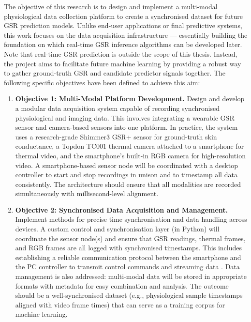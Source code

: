 The objective of this research is to design and implement a multi-modal physiological data collection platform to create a synchronised dataset for future GSR prediction models. Unlike end-user applications or final predictive systems, this work focuses on the data acquisition infrastructure --- essentially building the foundation on which real-time GSR inference algorithms can be developed later. Note that real-time GSR prediction is outside the scope of this thesis. Instead, the project aims to facilitate future machine learning by providing a robust way to gather ground-truth GSR and candidate predictor signals together. The following specific objectives have been defined to achieve this aim:

\begin{enumerate}
  \item \textbf{Objective 1: Multi-Modal Platform Development.} Design and develop a modular data acquisition system capable of recording synchronised physiological and imaging data. This involves integrating a wearable GSR sensor and camera-based sensors into one platform. In practice, the system uses a research-grade Shimmer3 GSR+ sensor \citep{ref8} for ground-truth skin conductance, a Topdon TC001 thermal camera \citep{ref20} attached to a smartphone for thermal video, and the smartphone's built-in RGB camera for high-resolution video. A smartphone-based sensor node will be coordinated with a desktop controller to start and stop recordings in unison and to timestamp all data consistently. The architecture should ensure that all modalities are recorded simultaneously with millisecond-level alignment.
  \item \textbf{Objective 2: Synchronised Data Acquisition and Management.} Implement methods for precise time synchronisation and data handling across devices. A custom control and synchronisation layer (in Python) will coordinate the sensor node(s) and ensure that GSR readings, thermal frames, and RGB frames are all logged with synchronised timestamps. This includes establishing a reliable communication protocol between the smartphone and the PC controller to transmit control commands and streaming data \citep{ref9}. Data management is also addressed: multi-modal data will be stored in appropriate formats with metadata for easy combination and analysis. The outcome should be a well-synchronised dataset (e.g., physiological sample timestamps aligned with video frame times) that can serve as a training corpus for machine learning.

\end{enumerate}
